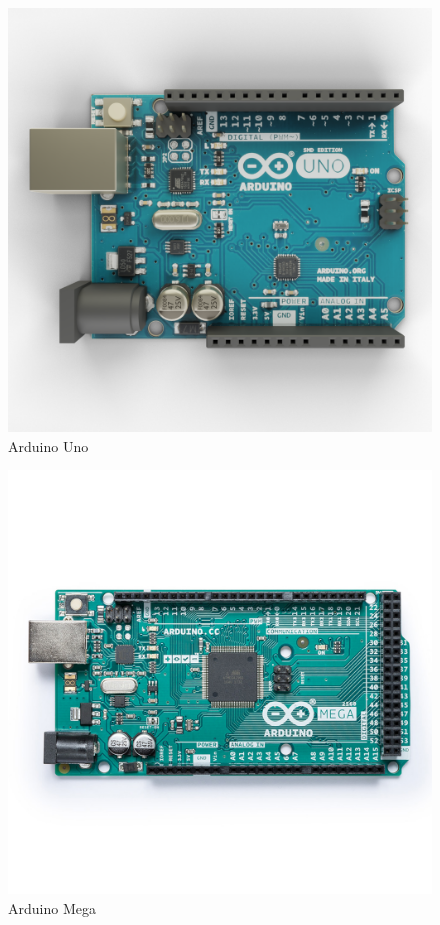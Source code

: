 \documentclass[12pt]{beamer}
\begin{document}
\begin{frame}[allowframebreaks]
    \framebreak%
    \begin{figure}
        \centering
        \includegraphics[height=.68\textheight]{arduino_uno}
        \caption{Arduino Uno}
    \end{figure}

    \framebreak%
    \begin{figure}
        \centering
        \includegraphics[height=.68\textheight]{arduino_mega}
        \caption{Arduino Mega}
    \end{figure}
\end{frame}
\end{document}
